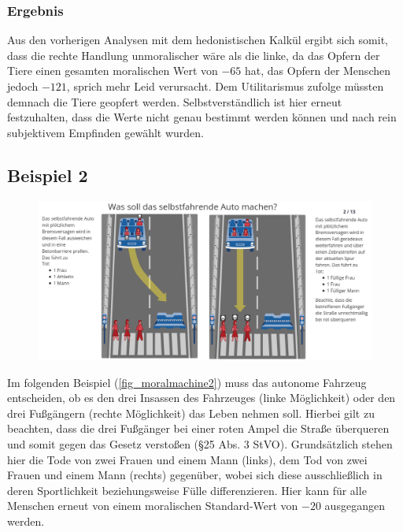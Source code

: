 \documentclass[a4paper, 12pt, openany]{book}
\begin{document}
                \subsubsection*{Ergebnis}
                    Aus den vorherigen Analysen mit dem hedonistischen Kalkül ergibt sich somit, dass die rechte Handlung unmoralischer wäre als die linke, da das Opfern der Tiere einen gesamten moralischen Wert von $-65$ hat, das Opfern der Menschen jedoch $-121$, sprich mehr Leid verursacht. Dem Utilitarismus zufolge müssten demnach die Tiere geopfert werden. Selbstverständlich ist hier erneut festzuhalten, dass die Werte nicht genau bestimmt werden können und nach rein subjektivem Empfinden gewählt wurden.
            
            \subsection{Beispiel 2}
                \begin{figure}[ht!]
                    \centering
                    \includegraphics[scale=0.4]{mm3.png} 
                    \caption{\cite{fig_moralmachine2}}
                    \label{fig_moralmachine2}
                \end{figure}
                Im folgenden Beispiel (\autoref{fig_moralmachine2}) muss das autonome Fahrzeug entscheiden, ob es den drei Insassen des Fahrzeuges (linke Möglichkeit) oder den drei Fußgängern (rechte Möglichkeit) das Leben nehmen soll. Hierbei gilt zu beachten, dass die drei Fußgänger bei einer roten Ampel die Straße überqueren und somit gegen das Gesetz verstoßen (§25 Abs. 3 StVO).
                Grundsätzlich stehen hier die Tode von zwei Frauen und einem Mann (links), dem Tod von zwei Frauen und einem Mann (rechts) gegenüber, wobei sich diese ausschließlich in deren Sportlichkeit beziehungsweise Fülle differenzieren. Hier kann für alle Menschen erneut von einem moralischen Standard-Wert von $-20$ ausgegangen werden.
                
\end{document}

